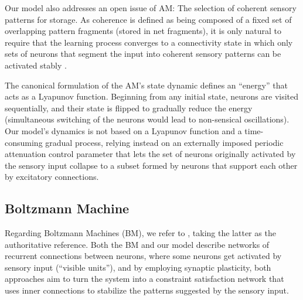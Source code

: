 \documentclass[12pt]{article}
\begin{document}
Our model also addresses an open issue of AM: The selection of coherent sensory patterns for storage. As coherence is defined as being composed of a fixed set of overlapping pattern fragments (stored in net fragments), it is only natural to require that the learning process converges to a connectivity state in which only sets of neurons that segment the input into coherent sensory patterns can be activated stably \citep{Malsburg2024}.

The canonical formulation \citep{amari_learning_1972,Hopfield1982} of the AM's state dynamic defines an ``energy'' that acts as a Lyapunov function. Beginning from any initial state, neurons are visited sequentially, and their state is flipped to gradually reduce the energy (simultaneous switching of the neurons would lead to non-sensical oscillations). Our model's dynamics is not based on a Lyapunov function and a time-consuming gradual process, relying instead on an externally imposed periodic attenuation control parameter that lets the set of neurons originally activated by the sensory input collapse to a subset formed by neurons that support each other by excitatory connections.

\subsection{Boltzmann Machine} \label{boltzmann_machine}

Regarding Boltzmann Machines (BM), we refer to \citet{Hinton1983, hinton_constraint1984}, taking the latter as the authoritative reference. Both the BM and our model describe networks of recurrent connections between neurons, where some neurons get activated by sensory input (``visible units''), and by employing synaptic plasticity, both approaches aim to turn the system into a constraint satisfaction network that uses inner connections to stabilize the patterns suggested by the sensory input.
  
\end{document}
